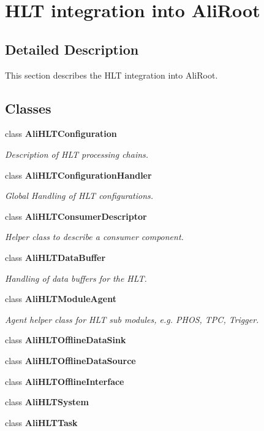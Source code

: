 \section{HLT integration into Ali\-Root}
\label{group__alihlt__system}


\subsection{Detailed Description}
This section describes the HLT integration into Ali\-Root. 

\subsection*{Classes}
\begin{CompactItemize}
\item 
class {\bf Ali\-HLTConfiguration}
\begin{CompactList}\small\item\em Description of HLT processing chains. \item\end{CompactList}\item 
class {\bf Ali\-HLTConfiguration\-Handler}
\begin{CompactList}\small\item\em Global Handling of HLT configurations. \item\end{CompactList}\item 
class {\bf Ali\-HLTConsumer\-Descriptor}
\begin{CompactList}\small\item\em Helper class to describe a consumer component. \item\end{CompactList}\item 
class {\bf Ali\-HLTData\-Buffer}
\begin{CompactList}\small\item\em Handling of data buffers for the HLT. \item\end{CompactList}\item 
class {\bf Ali\-HLTModule\-Agent}
\begin{CompactList}\small\item\em Agent helper class for HLT sub modules, e.g. PHOS, TPC, Trigger. \item\end{CompactList}\item 
class {\bf Ali\-HLTOffline\-Data\-Sink}
\item 
class {\bf Ali\-HLTOffline\-Data\-Source}
\item 
class {\bf Ali\-HLTOffline\-Interface}
\item 
class {\bf Ali\-HLTSystem}
\item 
class {\bf Ali\-HLTTask}
\end{CompactItemize}
